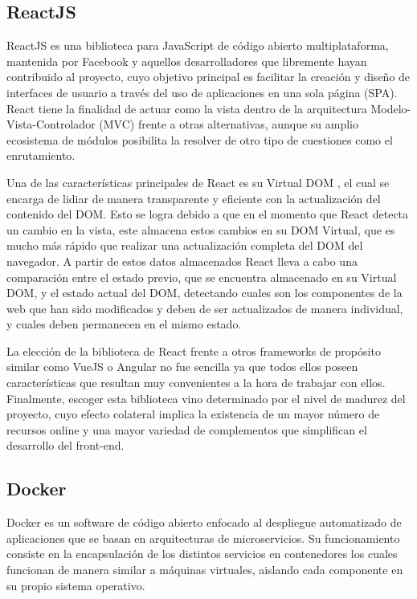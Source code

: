 \subsection{ReactJS}

ReactJS \cite{tech:react} es una biblioteca para JavaScript de código abierto multiplataforma, mantenida por Facebook y aquellos desarrolladores que libremente hayan contribuido al proyecto, cuyo objetivo principal es facilitar la creación y diseño de interfaces de usuario a través del uso de aplicaciones en una sola página (SPA). React tiene la finalidad de actuar como la vista dentro de la arquitectura Modelo-Vista-Controlador (MVC) frente a otras alternativas, aunque su amplio ecosistema de módulos posibilita la resolver de otro tipo de cuestiones como el enrutamiento.

Una de las características principales de React es su Virtual DOM \cite{tech:react_dom}, el cual se encarga de lidiar de manera transparente y eficiente con la actualización del contenido del DOM. Esto se logra debido a que en el momento que React detecta un cambio en la vista, este almacena estos cambios en su DOM Virtual, que es mucho más rápido que realizar una actualización completa del DOM del navegador. A partir de estos datos almacenados React lleva a cabo una comparación entre el estado previo, que se encuentra almacenado en su Virtual DOM, y el estado actual del DOM, detectando cuales son los componentes de la web que han sido modificados y deben de ser actualizados de manera individual, y cuales deben permanecen en el mismo estado.

La elección de la biblioteca de React frente a otros frameworks de propósito similar como VueJS o Angular no fue sencilla ya que todos ellos poseen características que resultan muy convenientes a la hora de trabajar con ellos. Finalmente, escoger esta biblioteca vino determinado por el nivel de madurez del proyecto, cuyo efecto colateral implica la existencia de un mayor número de recursos online y una mayor variedad de complementos que simplifican el desarrollo del front-end.

\subsection{Docker}

Docker \cite{tech:docker} es un software de código abierto enfocado al despliegue automatizado de aplicaciones que se basan en arquitecturas de microservicios. Su funcionamiento consiste en la encapsulación de los distintos servicios en contenedores los cuales funcionan de manera similar a máquinas virtuales, aislando cada componente en su propio sistema operativo. 

